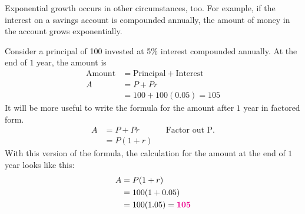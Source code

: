 \documentclass[10pt,]{book}
\theoremstyle{plain}
\theoremstyle{definition}
\theoremstyle{definition}
\theoremstyle{definition}
\theoremstyle{definition}
\theoremstyle{definition}
\numberwithin{equation}{section}
\newcommand{\alert}[1]{\mathbf{\color{magenta}{#1}}}
\newcommand{\amp}{ & }
\begin{document}
    Exponential growth occurs in other circumstances, too. For example, if the interest on a savings account is compounded annually, the amount of money in the account grows exponentially.
%
\par

    Consider a principal of \textdollar{}100 invested at 5\% interest compounded annually. At the end of \(1\) year, the amount is
    \begin{align*}
    \text{Amount} \amp = \text{Principal} + \text{Interest} \\
    A \amp = P + Pr\\
    \amp = 100 + 100(0.05) = 105
    \end{align*}
    It will be more useful to write the formula for the amount after \(1\) year in factored form.
    \begin{align*}
    A \amp = P + Pr \amp\amp \text{Factor out P.} \\
    \amp = P(1 + r)
    \end{align*}
    With this version of the formula, the calculation for the amount at the end of \(1\) year looks like this:
    \begin{align*}
    A \amp = P(1 + r ) \\
    \amp = 100(1 + 0.05) \\
    \amp = 100(1.05) = \alert{105}
    \end{align*}
%
\par
\end{document}
